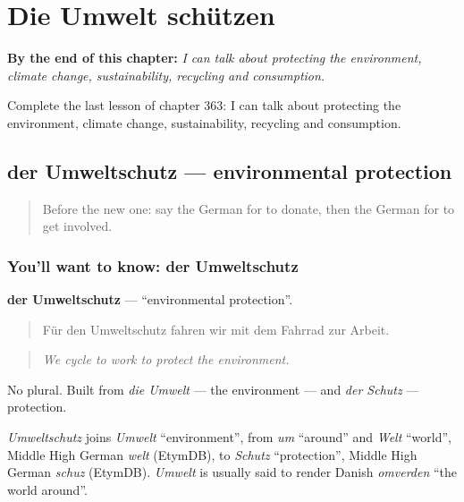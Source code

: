 
\chapter{Die Umwelt schützen}
\label{ch:ge-die-umwelt-schutzen}

\begin{chapteropening}
\textbf{By the end of this chapter:} \emph{I can talk about protecting the environment, climate change, sustainability, recycling and consumption.}

Complete the last lesson of chapter 363: I can talk about protecting the environment, climate change, sustainability, recycling and consumption.
\end{chapteropening}

\section[der Umweltschutz]{der Umweltschutz — environmental protection}

\label{lesson:GE-C363-umweltschutz}



\begin{quote}
Before the new one: say the German for to donate, then the German for to get involved.
\end{quote}

\subsection*{You'll want to know: der Umweltschutz}
\textbf{der Umweltschutz} — \textquotedblleft{}environmental protection\textquotedblright{}.

\begin{quote}
Für den Umweltschutz fahren wir mit dem Fahrrad zur Arbeit.
\end{quote}

\begin{quote}
\emph{We cycle to work to protect the environment.}
\end{quote}

No plural. Built from \emph{die Umwelt} — the environment — and \emph{der Schutz} — protection.

\begin{cousinweb}
\emph{Umweltschutz} joins \emph{Umwelt} \textquotedblleft{}environment\textquotedblright{}, from \emph{um} \textquotedblleft{}around\textquotedblright{} and \emph{Welt} \textquotedblleft{}world\textquotedblright{}, Middle High German \emph{welt} (EtymDB), to \emph{Schutz} \textquotedblleft{}protection\textquotedblright{}, Middle High German \emph{schuz} (EtymDB). \emph{Umwelt} is usually said to render Danish \emph{omverden} \textquotedblleft{}the world around\textquotedblright{}.
\end{cousinweb}

